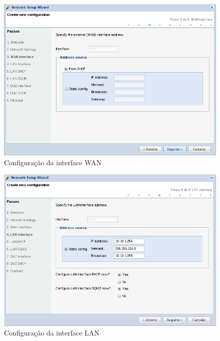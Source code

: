 \begin{figure}[H]
    \begin{center}
    \includegraphics[scale=0.38]{screenshots/etfw/etfw_wizard_03.png}
    \caption{Configuração da interface WAN}
    \label{fig:etfw_wizard_passo3}
    \end{center}
\end{figure}

\begin{figure}[H]
    \begin{center}
    \includegraphics[scale=0.38]{screenshots/etfw/etfw_wizard_04.png}
    \caption{Configuração da interface LAN}
    \label{fig:etfw_wizard_passo4}
    \end{center}
\end{figure}

